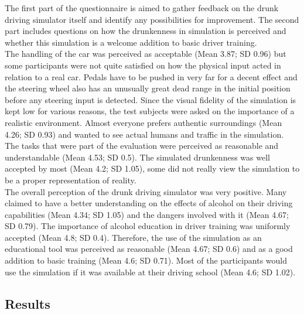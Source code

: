 The first part of the questionnaire is aimed to gather feedback on the drunk driving simulator itself and identify any possibilities for improvement.
The second part includes questions on how the drunkenness in simulation is perceived and whether this simulation is a welcome addition to basic driver training.
\\
The handling of the car was perceived as acceptable (Mean 3.87; SD 0.96) but some participants were not quite satisfied on how the physical input acted in relation to a real car.
Pedals have to be pushed in very far for a decent effect and the steering wheel also has an unusually great dead range in the initial position before any steering input is detected.
Since the visual fidelity of the simulation is kept low for various reasons, the test subjects were asked on the importance of a realistic environment.
Almost everyone prefers authentic surroundings (Mean 4.26; SD 0.93) and wanted to see actual humans and traffic in the simulation.
The tasks that were part of the evaluation were perceived as reasonable and understandable (Mean 4.53; SD 0.5).
The simulated drunkenness was well accepted by most (Mean 4.2; SD 1.05), some did not really view the simulation to be a proper representation of reality.
\\
The overall perception of the drunk driving simulator was very positive.
Many claimed to have a better understanding on the effects of alcohol on their driving capabilities (Mean 4.34; SD 1.05) and the dangers involved with it (Mean 4.67; SD 0.79).
The importance of alcohol education in driver training was uniformly accepted (Mean 4.8; SD 0.4).
Therefore, the use of the simulation as an educational tool was perceived as reasonable (Mean 4.67; SD 0.6) and as a good addition to basic training (Mean 4.6; SD 0.71).
Most of the participants would use the simulation if it was available at their driving school (Mean 4.6; SD 1.02).

\subsection{Results}
\label{subsection:results}

